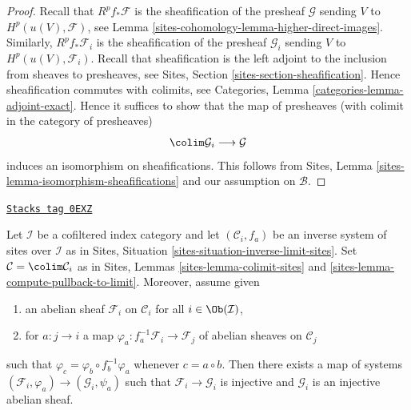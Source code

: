 \begin{proof}
Recall that $R^pf_*\mathcal{F}$ is the sheafification of the presheaf
$\mathcal{G}$ sending $V$ to $H^p(u(V), \mathcal{F})$, see
Lemma \ref{sites-cohomology-lemma-higher-direct-images}. Similarly,
$R^pf_*\mathcal{F}_i$ is the sheafification of the presheaf
$\mathcal{G}_i$ sending $V$ to $H^p(u(V), \mathcal{F}_i)$.
Recall that sheafification is the left adjoint to the inclusion
from sheaves to presheaves, see Sites, Section
\ref{sites-section-sheafification}. Hence sheafification commutes
with colimits, see Categories, Lemma \ref{categories-lemma-adjoint-exact}.
Hence it suffices to show that the map of presheaves (with colimit
in the category of presheaves)
$$
\colim \mathcal{G}_i \longrightarrow \mathcal{G}
$$
induces an isomorphism on sheafifications. This follows from
Sites, Lemma \ref{sites-lemma-isomorphism-sheafifications} and
our assumption on $\mathcal{B}$.
\end{proof}

\begin{lemma}
\label{sites-cohomology-lemma-colim-sites-injective}
\href{https://stacks.math.columbia.edu/tag/0EXZ}{\texttt{Stacks tag 0EXZ}}

Let $\mathcal{I}$ be a cofiltered index category and let
$(\mathcal{C}_i, f_a)$ be an inverse system of sites over $\mathcal{I}$
as in Sites, Situation \ref{sites-situation-inverse-limit-sites}.
Set $\mathcal{C} = \colim \mathcal{C}_i$ as in Sites,
Lemmas \ref{sites-lemma-colimit-sites} and
\ref{sites-lemma-compute-pullback-to-limit}.
Moreover, assume given
\begin{enumerate}
\item an abelian sheaf $\mathcal{F}_i$ on $\mathcal{C}_i$ for all
$i \in \Ob(\mathcal{I})$,
\item for $a : j \to i$ a map
$\varphi_a : f_a^{-1}\mathcal{F}_i \to \mathcal{F}_j$
of abelian sheaves on $\mathcal{C}_j$
\end{enumerate}
such that $\varphi_c = \varphi_b \circ f_b^{-1}\varphi_a$
whenever $c = a \circ b$. Then there exists a map of systems
$(\mathcal{F}_i, \varphi_a) \to (\mathcal{G}_i, \psi_a)$
such that $\mathcal{F}_i \to \mathcal{G}_i$ is injective and
$\mathcal{G}_i$ is an injective abelian sheaf.
\end{lemma}

